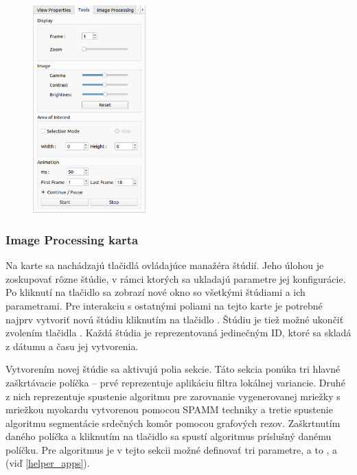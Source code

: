 {\begin {figure}[H]
        \centering
        \includegraphics[height=8cm]{media/existing_app/tabs/tools.png}
        \captionsetup{justification=centering}
\end {figure}

\clearpage

\subsubsection {Image Processing karta}\label{image_processing_tab}
Na  karte sa nachádzajú tlačidlá ovládajúce manažéra štúdií. Jeho úlohou je zoskupovať rôzne štúdie, v rámci ktorých sa ukladajú parametre jej konfigurácie. Po kliknutí na tlačidlo  sa zobrazí nové okno so všetkými štúdiami a ich parametrami. Pre interakciu s ostatnými poliami na tejto karte je potrebné najprv vytvoriť novú štúdiu kliknutím na tlačidlo . Štúdiu je tiež možné ukončiť zvolením tlačidla . Každá štúdia je reprezentovaná jedinečným ID, ktoré sa skladá z dátumu a času jej vytvorenia.

Vytvorením novej štúdie sa aktivujú polia  sekcie. Táto sekcia ponúka tri hlavné zaškrtávacie políčka -- prvé reprezentuje aplikáciu filtra lokálnej variancie. Druhé z nich reprezentuje spustenie algoritmu pre zarovnanie vygenerovanej mriežky s mriežkou myokardu vytvorenou pomocou SPAMM techniky a tretie spustenie algoritmu segmentácie srdečných komôr pomocou grafových rezov. Zaškrtnutím daného políčka a kliknutím na tlačidlo  sa spustí algoritmus príslušný danému políčku. Pre  algoritmus je v tejto sekcii možné definovať tri parametre, a to ,  a  (viď \ref{helper_apps}).

}

